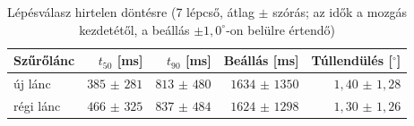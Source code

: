 \begin{table}[htbp]
  \centering
  \small
  \begin{tabular}{@{}lrrrr@{}}
    \toprule
    Szűrőlánc & $t_{50}$ [ms] & $t_{90}$ [ms] & Beállás [ms] & Túllendülés [$^\circ$] \\
    \midrule
    új lánc & $385$ $\pm$ $281$ & $813$ $\pm$ $480$ & $1634$ $\pm$ $1350$ & $1{,}40$ $\pm$ $1{,}28$ \\
    régi lánc & $466$ $\pm$ $325$ & $837$ $\pm$ $484$ & $1624$ $\pm$ $1298$ & $1{,}30$ $\pm$ $1{,}26$ \\
    \bottomrule
  \end{tabular}
  \caption{Lépésválasz hirtelen döntésre (7 lépcső, átlag $\pm$ szórás; az idők a mozgás kezdetétől, a beállás $\pm1{,}0^\circ$-on belülre értendő)}
  \label{tab:lepcso}
\end{table}
